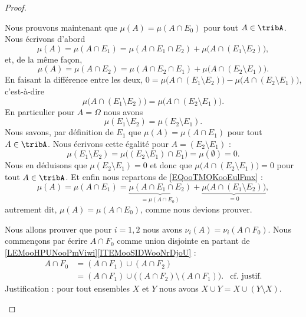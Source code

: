 \begin{proof}
\begin{subproof}
		\spitem[\( \mu(A)=\mu(A\cap E_0)\)]
		Nous prouvons maintenant que \( \mu(A)=\mu(A\cap E_0)\) pour tout \( A\in\tribA\). Nous écrivons d'abord
		\begin{equation}	\label{EQooTMOKooEulFmx}
			\mu(A)=\mu(A\cap E_1)=\mu(A\cap E_1\cap E_2)+\mu\big( A\cap(E_1\setminus E_2) \big),
		\end{equation}
		et, de la même façon,
		\begin{equation}
			\mu(A)=\mu(A\cap E_2)=\mu(A\cap E_2\cap E_1)+\mu\big( A\cap(E_2\setminus E_1) \big).
		\end{equation}
		En faisant la différence entre les deux, \( 0=\mu\big( A\cap(E_1\setminus E_2) \big)-\mu\big( A\cap(E_2\setminus E_1) \big)\), c'est-à-dire
		\begin{equation}
			\mu\big( A\cap(E_1\setminus E_2) \big)=\mu\big( A\cap(E_2\setminus E_1) \big).
		\end{equation}
		En particulier pour \( A=\Omega\) nous avons
		\begin{equation}
			\mu(E_1\setminus E_2)=\mu(E_2\setminus E_1).
		\end{equation}
		Nous savons, par définition de \( E_1\) que \( \mu(A)=\mu(A\cap E_1)\) pour tout \( A\in\tribA\). Nous écrivons cette égalité pour \( A=(E_2\setminus E_1)\) :
		\begin{equation}
			\mu(E_1\setminus E_2)=\mu\big( (E_2\setminus E_1)\cap E_1 \big)=\mu(\emptyset)=0.
		\end{equation}
		Nous en déduisons que \( \mu(E_2\setminus E_1)=0\) et donc que \( \mu\big( A\cap(E_2\setminus E_1) \big)=0\) pour tout \( A\in\tribA\). Et enfin nous repartons de \eqref{EQooTMOKooEulFmx} :
		\begin{equation}
			\mu(A)=\mu(A\cap E_1)=\underbrace{\mu(A\cap E_1\cap E_2)}_{=\mu(A\cap E_0)}+\underbrace{\mu\big( A\cap(E_1\setminus E_2) \big)}_{=0},
		\end{equation}
		autrement dit, \( \mu(A)=\mu(A\cap E_0)\), comme nous devions prouver.

		\spitem[\( \nu_i(A)=\nu_i(A\cap F_0)\)]
		Nous allons prouver que pour \( i=1,2\) nous avons \( \nu_i(A)=\nu_i(A\cap F_0)\). Nous commençons par écrire \( A\cap F_0\) comme union disjointe en partant de \ref{LEMooHPUNooPmViwi}\ref{ITEMooSIDWooNrDjoU} :
		\begin{subequations}
			\begin{align}
				A\cap F_0 & =(A\cap F_1)\cup (A\cap F_2)                                                       \\
				          & =(A\cap F_1)\cup\big( (A\cap F_2)\setminus (A\cap F_1) \big). & \text{cf. justif.}
			\end{align}
		\end{subequations}
		Justification : pour tout ensembles \( X\) et \( Y\) nous avons \( X\cup Y=X\cup(Y\setminus X)\).


\end{subproof}
\end{proof}
